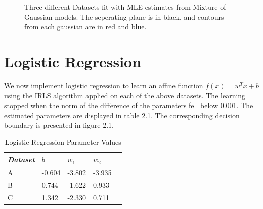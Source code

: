 \documentclass[paper=a4, fontsize=11pt]{scrartcl} %
\numberwithin{equation}{section} %
\numberwithin{figure}{section} %
\numberwithin{table}{section} %
\begin{document}
\begin{figure}
\begin{subfigure}{.5\textwidth}
	\end{subfigure}
	\caption{Three different Datasets fit with MLE estimates from Mixture of Gaussian models. The seperating plane is in black, and contours from each gaussian are in red and blue.}
	\end{figure}
	
\section{Logistic Regression}
	We now implement logistic regression to learn an affine function \(f(x) = w^Tx+b\) using the IRLS algorithm applied on each of the above datasets. The learning stopped when the norm of the difference of the parameters fell below 0.001. The estimated parameters are displayed in table 2.1. The corresponding decision boundary is presented in figure 2.1.
	
	\begin{table}
		\caption {Logistic Regression Parameter Values} \label{tab:title} 
		\begin{center}		
			\begin{tabular}{*5l}   
			\toprule
				\emph{Dataset}&  $b$ & $w_1$  & $w_2$\\\midrule
				A & -0.604 & -3.802 & -3.935 \\ 
				B & 0.744 & -1.622 & 0.933 \\
				C & 1.342 & -2.330 & 0.711 \\\bottomrule
				\hline
			\end{tabular}
		\end{center}
	\end{table}
	
\end{document}
